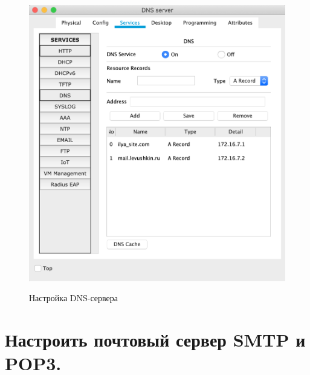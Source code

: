 \documentclass[a4paper,12pt]{article}
\begin{document}
	\begin{figure}[h!]
		\begin{center}
			{\includegraphics[scale = 0.7]{8.png}}
			\label{ris:8}
		\end{center}
		\caption{Настройка DNS-сервера}
	\end{figure}

	\newpage
	
	\section{Настроить почтовый сервер SMTP и POP3.}
	
\end{document}
